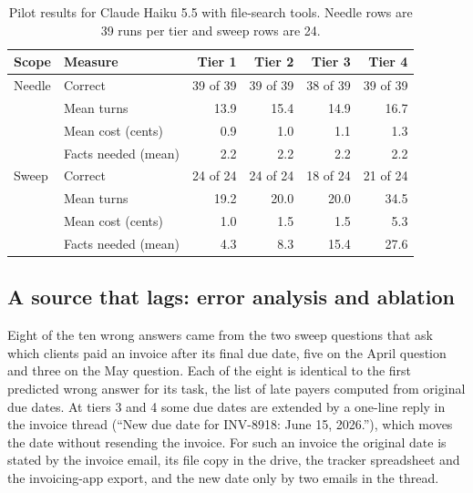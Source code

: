 \documentclass{article}
\begin{document}
\begin{table}[t]
  \caption{Pilot results for Claude Haiku 5.5 with file-search tools. Needle rows are 39 runs per tier and sweep rows are 24.}
  \label{tab:results}
  \centering
  \small
  \begin{tabular}{@{}llrrrr@{}}
    \toprule
    Scope & Measure & Tier 1 & Tier 2 & Tier 3 & Tier 4 \\
    \midrule
    Needle & Correct                & 39 of 39 & 39 of 39 & 38 of 39 & 39 of 39 \\
           & Mean turns             & 13.9 & 15.4 & 14.9 & 16.7 \\
           & Mean cost (cents)      & 0.9  & 1.0  & 1.1  & 1.3  \\
           & Facts needed (mean)    & 2.2  & 2.2  & 2.2  & 2.2  \\
    \midrule
    Sweep  & Correct                & 24 of 24 & 24 of 24 & 18 of 24 & 21 of 24 \\
           & Mean turns             & 19.2 & 20.0 & 20.0 & 34.5 \\
           & Mean cost (cents)      & 1.0  & 1.5  & 1.5  & 5.3  \\
           & Facts needed (mean)    & 4.3  & 8.3  & 15.4 & 27.6 \\
    \bottomrule
  \end{tabular}
\end{table}

\subsection{A source that lags: error analysis and ablation}
\label{sec:lag}

Eight of the ten wrong answers came from the two sweep questions that ask which clients paid an invoice after its final due date, five on the April question and three on the May question. Each of the eight is identical to the first predicted wrong answer for its task, the list of late payers computed from original due dates. At tiers 3 and 4 some due dates are extended by a one-line reply in the invoice thread (``New due date for INV-8918: June 15, 2026.''), which moves the date without resending the invoice. For such an invoice the original date is stated by the invoice email, its file copy in the drive, the tracker spreadsheet and the invoicing-app export, and the new date only by two emails in the thread.
\end{document}
